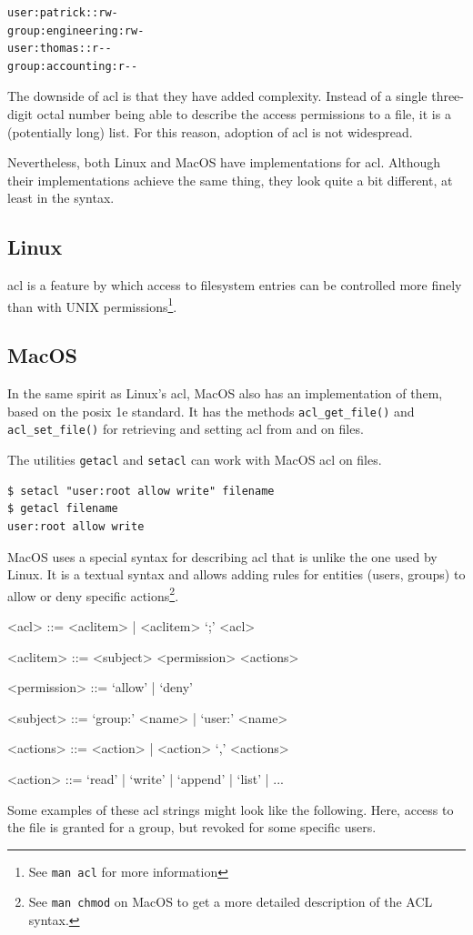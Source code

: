 \documentclass[a4paper]{article}
\begin{document}
\begin{verbatim}
user:patrick::rw-
group:engineering:rw-
user:thomas::r--
group:accounting:r--
\end{verbatim}

The downside of \gls{acl} is that they have added complexity. Instead of a single three-digit octal number being able to describe the access permissions to a file, it is a (potentially long) list. For this reason, adoption of \gls{acl} is not widespread.

Nevertheless, both Linux and MacOS have implementations for \gls{acl}. Although their implementations achieve the same thing, they look quite a bit different, at least in the syntax.

\subsection{Linux}

\gls{acl} is a feature by which access to filesystem entries can be controlled more finely than with UNIX permissions\footnote{See \texttt{man acl} for more information}.

\subsection{MacOS}

In the same spirit as Linux's \gls{acl}, MacOS also has an implementation of them, based on the \gls{posix} 1e standard. It has the methods \verb|acl_get_file()| and \verb|acl_set_file()| for retrieving and setting \gls{acl} from and on files.

The utilities \verb|getacl| and \verb|setacl| can work with MacOS \gls{acl} on files.

\begin{verbatim}
$ setacl "user:root allow write" filename
$ getacl filename
user:root allow write  
\end{verbatim}
MacOS uses a special syntax for describing \gls{acl} that is unlike the one used by Linux. It is a textual syntax and allows adding rules for entities (users, groups) to allow or deny specific actions\footnote{See \texttt{man chmod} on MacOS to get a more detailed description of the ACL syntax.}.

\setlength{\grammarindent}{8em}
\begin{grammar}
<acl> ::= <aclitem> | <aclitem> ‘;’ <acl>

<aclitem> ::= <subject> <permission> <actions>

<permission> ::= ‘allow’ | ‘deny’

<subject> ::= ‘group:’ <name> | ‘user:’ <name>

<actions> ::= <action> | <action> ‘,’ <actions>

<action> ::= ‘read’ | ‘write’ | ‘append’ | ‘list’ | ...
\end{grammar}
Some examples of these \gls{acl} strings might look like the following. Here, access to the file is granted for a group, but revoked for some specific users.
\end{document}

